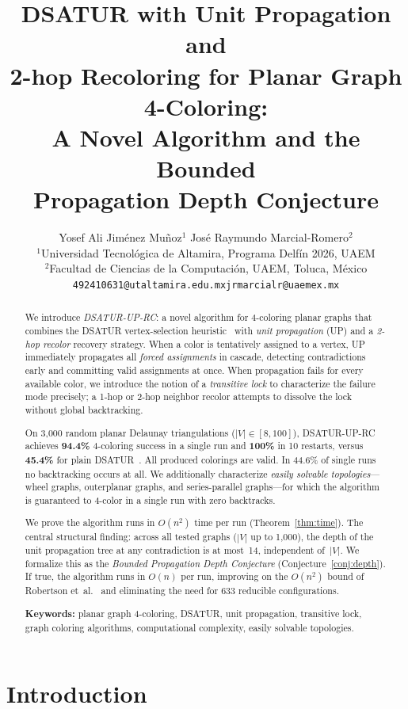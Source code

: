 \documentclass[11pt,twocolumn]{article}
\title{\textbf{DSATUR with Unit Propagation and\\
2-hop Recoloring for Planar Graph 4-Coloring:\\
A Novel Algorithm and the Bounded\\
Propagation Depth Conjecture}}
\author{
  Yosef Ali Jim\'{e}nez Mu\~{n}oz$^{1}$
  \quad
  Jos\'{e} Raymundo Marcial-Romero$^{2}$
  \\[4pt]
  {\small $^1$Universidad Tecnol\'ogica de Altamira, Programa Delf\'in 2026, UAEM}\\
  {\small $^2$Facultad de Ciencias de la Computaci\'on, UAEM, Toluca, M\'exico}\\
  {\small \texttt{492410631@utaltamira.edu.mx}\quad\texttt{jrmarcialr@uaemex.mx}}
}
\date{}
\begin{document}
\maketitle

\begin{abstract}
We introduce \emph{DSATUR-UP-RC}: a novel algorithm for 4-coloring planar
graphs that combines the DSATUR vertex-selection
heuristic~\cite{brelaz1979} with \emph{unit propagation} (UP) and a
\emph{2-hop recolor} recovery strategy.  When a color is tentatively
assigned to a vertex, UP immediately propagates all \emph{forced
assignments} in cascade, detecting contradictions early and committing
valid assignments at once.  When propagation fails for every available
color, we introduce the notion of a \emph{transitive lock} to characterize
the failure mode precisely; a 1-hop or 2-hop neighbor recolor attempts to
dissolve the lock without global backtracking.

On 3{,}000 random planar Delaunay triangulations ($|V|\in[8,100]$),
DSATUR-UP-RC achieves \textbf{94.4\%} 4-coloring success in a single run
and \textbf{100\%} in 10 restarts, versus \textbf{45.4\%} for plain
DSATUR~\cite{brelaz1979}.  All produced colorings are valid.  In 44.6\%
of single runs no backtracking occurs at all.  We additionally characterize
\emph{easily solvable topologies}---wheel graphs, outerplanar graphs, and
series-parallel graphs---for which the algorithm is guaranteed to 4-color
in a single run with zero backtracks.

We prove the algorithm runs in $O(n^2)$ time per run (Theorem~\ref{thm:time}).
The central structural finding: across all tested graphs ($|V|$ up to
1{,}000), the depth of the unit propagation tree at any contradiction is
at most~14, independent of~$|V|$.  We formalize this as the
\emph{Bounded Propagation Depth Conjecture}
(Conjecture~\ref{conj:depth}).  If true, the algorithm runs in $O(n)$
per run, improving on the $O(n^2)$ bound of Robertson
et~al.~\cite{robertson1997} and eliminating the need for 633 reducible
configurations.

\medskip\noindent\textbf{Keywords:} planar graph 4-coloring, DSATUR,
unit propagation, transitive lock, graph coloring algorithms,
computational complexity, easily solvable topologies.
\end{abstract}

\section{Introduction}
\end{document}
